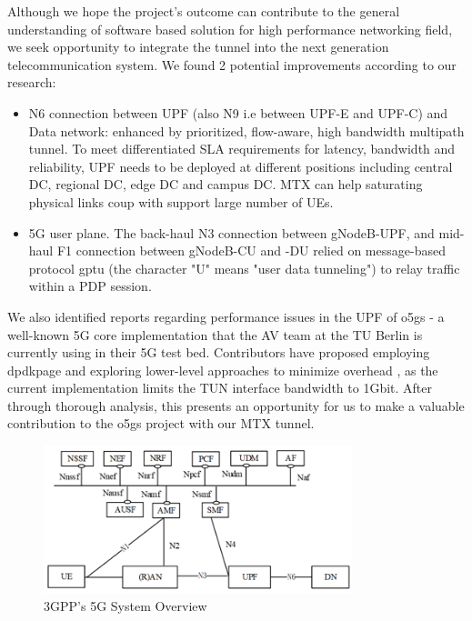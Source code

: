 Although we hope the project's outcome can contribute to the general understanding of software based solution for high performance networking field, we seek opportunity to integrate the tunnel into the next generation telecommunication system. We found 2 potential improvements according to our research: 
\begin{itemize}
    \item N6 connection between UPF (also N9 i.e between UPF-E and UPF-C) and Data network: enhanced by prioritized, flow-aware, high bandwidth multipath tunnel. To meet differentiated SLA requirements for latency, bandwidth and reliability, UPF needs to be deployed at different positions including central DC, regional DC, edge DC and campus DC. MTX can help saturating physical links coup with support large number of UEs.
    \item 5G user plane. The back-haul N3 connection between gNodeB-UPF, and mid-haul F1 connection between gNodeB-CU and -DU relied on message-based protocol \ac{gptu} (the character "U" means "user data tunneling") to relay traffic within a PDP session.
\end{itemize}

We also identified reports regarding performance issues in the \ac{UPF} of \ac{o5gs} - a well-known 5G core implementation that the AV team at the TU Berlin is currently using in their 5G test bed. 
Contributors have proposed employing \ac{dpdkpage} and exploring lower-level approaches to minimize overhead \cite{open5gs_github_udp_perf_cap}\cite{open5gs_github_dpdk}, as the current implementation limits the TUN interface bandwidth to 1Gbit. 
After through thorough analysis, this presents an opportunity for us to make a valuable contribution to the \ac{o5gs} project with our MTX tunnel.

\begin{figure}[H]
	\centering
	\includegraphics[width=0.8\textwidth]{resources/images/3gpp_5g_system_overview.png}
	\caption{3GPP's 5G System Overview \cite{3gpp_5g_system_overview}}
    \label{fig:introduction:3gpp_5g_system_overview}
\end{figure}



